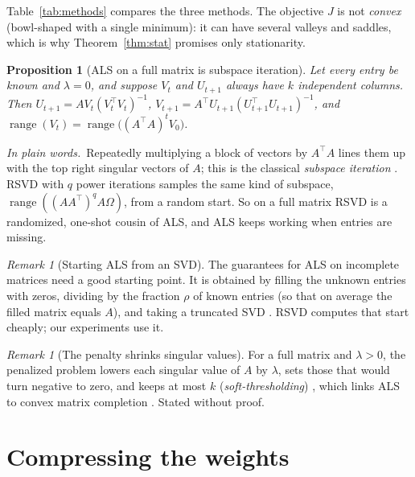 \documentclass[10pt]{article}
\theoremstyle{plain}
\newtheorem{proposition}[theorem]{Proposition}
\theoremstyle{definition}
\theoremstyle{remark}
\newtheorem{remark}[theorem]{Remark}
\newcommand{\T}{^{\top}}
\DeclareMathOperator{\range}{range}
\newcommand{\plain}{\noindent\emph{In plain words.}\ }
\begin{document}
Table~\ref{tab:methods} compares the three methods. The objective $J$ is not \emph{convex} (bowl-shaped with a single minimum): it can have several valleys and saddles, which is why Theorem~\ref{thm:stat} promises only stationarity.

\begin{proposition}[ALS on a full matrix is subspace iteration]\label{prop:subspace}
Let every entry be known and $\lambda=0$, and suppose $V_t$ and $U_{t+1}$ always have $k$ independent columns. Then $U_{t+1}=AV_t(V_t\T V_t)^{-1}$, $V_{t+1}=A\T U_{t+1}(U_{t+1}\T U_{t+1})^{-1}$, and $\range(V_t)=\range\bigl((A\T A)^tV_0\bigr)$.
\end{proposition}

\plain Repeatedly multiplying a block of vectors by $A\T A$ lines them up with the top right singular vectors of $A$; this is the classical \emph{subspace iteration} \cite{golubvanloan2013}. RSVD with $q$ power iterations samples the same kind of subspace, $\range((AA\T)^qA\Omega)$, from a random start. So on a full matrix RSVD is a randomized, one-shot cousin of ALS, and ALS keeps working when entries are missing.

\begin{remark}[Starting ALS from an SVD]\label{rem:hybrid}
The guarantees for ALS on incomplete matrices need a good starting point. It is obtained by filling the unknown entries with zeros, dividing by the fraction $\rho$ of known entries (so that on average the filled matrix equals $A$), and taking a truncated SVD \cite{jain2013,hardt2014}. RSVD computes that start cheaply; our experiments use it.
\end{remark}

\begin{remark}[The penalty shrinks singular values]\label{rem:nuclear}
For a full matrix and $\lambda>0$, the penalized problem lowers each singular value of $A$ by $\lambda$, sets those that would turn negative to zero, and keeps at most $k$ (\emph{soft-thresholding}) \cite{mazumder2010}, which links ALS to convex matrix completion \cite{candesrecht2009}. Stated without proof.
\end{remark}


\section{Compressing the weights}
\label{sec:weights}
\end{document}
